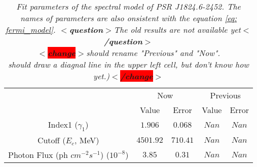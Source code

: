 \documentclass[12pt]{report}
\newcommand{\mycaption}[1]{\caption{\textit{\footnotesize #1}}}
\newcommand{\singleFig}[3]{
 \begin{figure}[!ht]
  \centering
  \texttt{[image: /Users/grewwc/Desktop/Thesis/\#1]}
  \mycaption{#3}
 \label{fig: #1}
 \end{figure}
 \vspace{0.5cm} 
}
\newcommand{\question}[1]{
  $<$\textbf{question}$>$#1$<$\textbf{/question}$>$
}
\newcommand{\change}[1]{
  $<$\colorbox{red}{\textbf{change}}$>$#1$<$\colorbox{red}{\textbf{/change}}$>$
}
\begin{document}
            \begin{table}[!ht]
              \centering
                \begin{tabular}{|c|c|c|c|c|}
                  \cline{1-5}
                  & \multicolumn{2}{|c|}{Now} & \multicolumn{2}{|c|}{Previous} \\
                  \cline{1-5}
                  & Value & Error & Value & Error \\
                  \hline
                  Index1 ($\gamma_1$) & $1.906$ & $0.068$ & $Nan$ & $Nan$ \\
                  \hline 
                  Cutoff ($E_c$, MeV) & $4501.92$ & $710.41$ & $Nan$ & $Nan$ \\
                  \hline 
                  Photon Flux (ph $cm^{-2} s^{-1}$) ($10^{-8}$) & $3.85$ & $0.31$ & $Nan$ & $Nan$ \\ 
                  \hline
                \end{tabular}    
                \mycaption{Fit parameters of the spectral model of PSR J1824.6-2452. 
                  The names of parameters are also onsistent with the equation
                  \ref{eq: fermi_model}. \question{The old results are not available yet} \\
                  \change{should rename "Previous" and "Now". \\ 
                      should draw a diagnal line in the upper left cell, but don't know how yet.)}}
                \label{table: b1821_fit_result}        
            \end{table}  
            \vspace{1cm}
\end{document}
